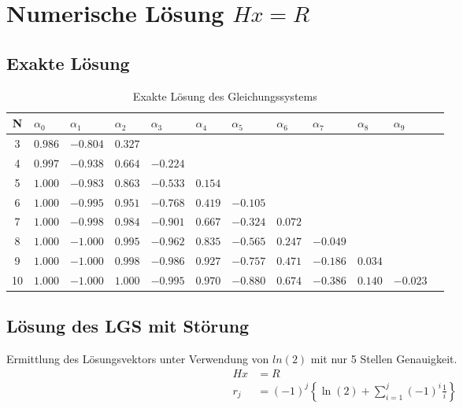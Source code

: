 \documentclass{beamer}
\begin{document}
  \section{Numerische Lösung $Hx=R$}
  \subsection{Exakte Lösung}
  \begin{frame}
    \centering    
    \begin{table}[htbp]
    \tiny   
    \renewcommand{\arraystretch}{1.5}
    \begin{tabularx}{\textwidth}{|c|X|X|X|X|X|X|X|X|X|X|X|}
        \hline    
        N & $\alpha_0$&$\alpha_1$&$\alpha_2$&$\alpha_3$&$\alpha_4$&$\alpha_5$&$\alpha_6$&$\alpha_7$&$\alpha_8$&$\alpha_9$ \\\hline
        3 & $0.986$ & $-0.804$ &  $0.327$ &&&&&&& \\\hline
        4 & $0.997$ & $-0.938$ &  $0.664$ & $-0.224$ &&&&&& \\\hline
        5 & $1.000$ & $-0.983$ &  $0.863$ & $-0.533$ &  $0.154$ &&&&& \\\hline
        6 & $1.000$ & $-0.995$ &  $0.951$ & $-0.768$ &  $0.419$ & $-0.105$ &&&& \\\hline
        7 & $1.000$ & $-0.998$ &  $0.984$ & $-0.901$ &  $0.667$ & $-0.324$ &  $0.072$ &&& \\\hline
        8 & $1.000$ & $-1.000$ &  $0.995$ & $-0.962$ &  $0.835$ & $-0.565$ &  $0.247$ & $-0.049$ && \\\hline
        9 & $1.000$ & $-1.000$ &  $0.998$ & $-0.986$ &  $0.927$ & $-0.757$ &  $0.471$ & $-0.186$ &  $0.034$ & \\\hline
        10 & $1.000$ & $-1.000$ &  $1.000$ & $-0.995$ &  $0.970$ & $-0.880$ &  $0.674$ & $-0.386$ &  $0.140$ & $-0.023$  \\\hline
    \end{tabularx}
    \caption{Exakte Lösung des Gleichungssystems}      
    \end{table}
  \end{frame}
  
  \subsection{Lösung des LGS mit Störung}
  \begin{frame}
    Ermittlung des Lösungsvektors unter Verwendung von $ln(2)$ mit nur 5 Stellen Genauigkeit.
    \begin{align}
      Hx&=R\\
      r_j&= (-1)^j \left\{ \ln(2) + \sum_{i=1}^j (-1)^i \frac{1}{i} \right\}
    \end{align}
   
  \end{frame}
  
\end{document}
